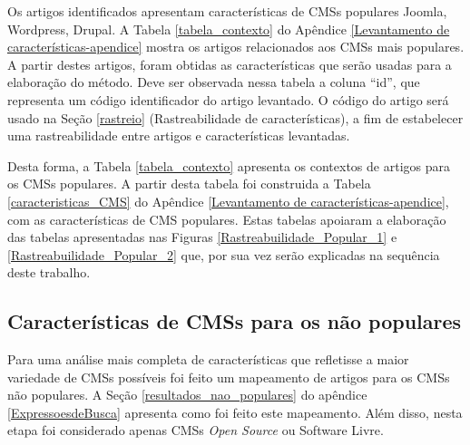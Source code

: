 Os artigos identificados apresentam características de CMSs populares {Joomla, Wordpress, Drupal}. A Tabela \ref{tabela_contexto} do Apêndice \ref{Levantamento de características-apendice} mostra os artigos relacionados aos CMSs mais populares. A partir destes artigos, foram obtidas as características que serão usadas para a elaboração do método. Deve ser observada nessa tabela a coluna “id”, que representa um código identificador do artigo levantado. O código do artigo  será usado na Seção \ref{rastreio} (Rastreabilidade de características), a fim de estabelecer uma rastreabilidade entre artigos e características levantadas.

Desta forma, a Tabela \ref{tabela_contexto} apresenta os contextos de artigos para os CMSs populares. A partir desta tabela foi construida a Tabela \ref{caracteristicas_CMS} do Apêndice \ref{Levantamento de características-apendice}, com as características de CMS populares. Estas tabelas apoiaram a elaboração das tabelas apresentadas nas Figuras \ref{Rastreabuilidade_Popular_1} e \ref{Rastreabuilidade_Popular_2} que, por sua vez serão explicadas na sequência deste trabalho.
	


	
\subsection{Características de CMSs para os não populares}


Para uma análise mais completa de características que refletisse a maior variedade de CMSs possíveis foi feito um mapeamento de artigos para os CMSs não populares. A Seção \ref{resultados_nao_populares} do apêndice \ref{ExpressoesdeBusca} apresenta como foi feito este mapeamento. Além disso, nesta etapa foi considerado apenas CMSs \textit{Open Source} ou Software Livre.
  
